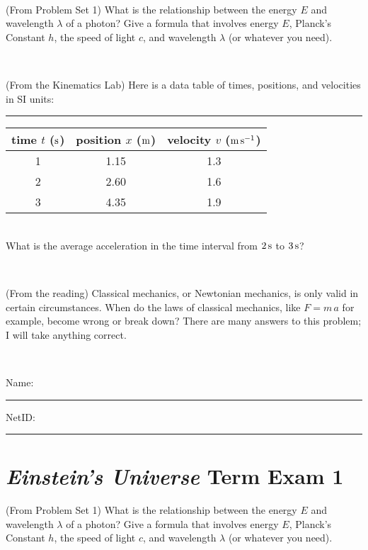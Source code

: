 \documentclass[12pt, letterpaper]{article}
\begin{document}
\vfill ~

\begin{problem} (From Problem Set 1)
What is the relationship between the energy $E$ and wavelength
$\lambda$ of a photon? Give a formula that involves energy $E$,
Planck's Constant $h$, the speed of light $c$, and wavelength
$\lambda$ (or whatever you need).
\end{problem}

\vfill ~

\begin{problem} (From the Kinematics Lab)
Here is a data table of times, positions, and velocities in SI units:\\
\rule{1.0in}{0pt}\begin{tabular}{c|c|c}
time $t$ ($\mathrm{s}$) & position $x$ ($\mathrm{m}$) & velocity $v$ ($\mathrm{m}\,\mathrm{s}^{-1}$) \\
\hline
1 & 1.15 & 1.3 \\
2 & 2.60 & 1.6 \\
3 & 4.35 & 1.9 \\
\hline
\end{tabular}\\
What is the average acceleration in the time interval from $2\,\mathrm{s}$ to $3\,\mathrm{s}$?
\end{problem}


\vfill ~

\begin{problem} (From the reading)
Classical mechanics, or Newtonian mechanics, is only valid in certain
circumstances. When do the laws of classical mechanics, like $F =
m\,a$ for example, become wrong or break down? There are many answers
to this problem; I will take anything correct.
\end{problem}


\vfill ~


\cleardoublepage



\noindent
Name: \rule[-1ex]{0.60\textwidth}{0.1pt}
NetID: \rule[-1ex]{0.20\textwidth}{0.1pt}

\section*{\textsl{Einstein's Universe} Term Exam 1}
\setcounter{problem}{1}


\begin{problem} (From Problem Set 1)
What is the relationship between the energy $E$ and wavelength
$\lambda$ of a photon? Give a formula that involves energy $E$,
Planck's Constant $h$, the speed of light $c$, and wavelength
$\lambda$ (or whatever you need).
\end{problem}
\end{document}
